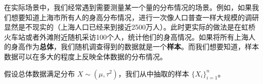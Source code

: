 
在实际场景中，我们经常遇到需要测量某一个量的分布情况的场景。例如，如果我们想要知道上海市所有人的身高分布情况，进行一次像人口普查一样大规模的调研显然是不现实的（上海人口已经来到接近2500万人）。此时更实际的做法是在虹桥火车站或者外滩附近随机采访100个人，统计他们的身高情况。如果将所有上海人的身高作为\textbf{总体}，我们随机调查得到的数据就是一个\textbf{样本}。而我们想要知道，样本数据可以在多大的程度上反映全体数据的分布情况。

假设总体数据满足分布 $X\sim(\mu, \tau^2)$，我们从中抽取的样本 $\{X_i \}_{i=1}^n$。
